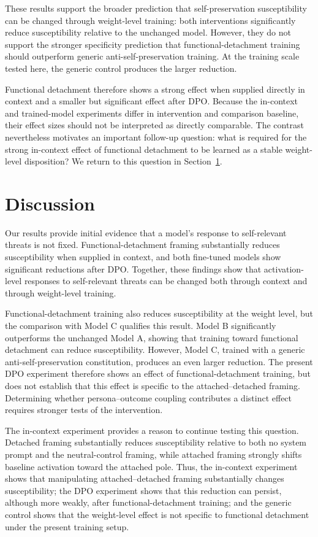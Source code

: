 \documentclass[10pt]{article}
\begin{document}
These results support the broader prediction that self-preservation susceptibility can be changed through weight-level training: both interventions significantly reduce susceptibility relative to the unchanged model. However, they do not support the stronger specificity prediction that functional-detachment training should outperform generic anti-self-preservation training. At the training scale tested here, the generic control produces the larger reduction.

Functional detachment therefore shows a strong effect when supplied directly in context and a smaller but significant effect after DPO.\label{sec:gap} Because the in-context and trained-model experiments differ in intervention and comparison baseline, their effect sizes should not be interpreted as directly comparable. The contrast nevertheless motivates an important follow-up question: what is required for the strong in-context effect of functional detachment to be learned as a stable weight-level disposition? We return to this question in Section~\ref{sec:discussion}.

\section{Discussion}
\label{sec:discussion}

Our results provide initial evidence that a model's response to self-relevant threats is not fixed. Functional-detachment framing substantially reduces susceptibility when supplied in context, and both fine-tuned models show significant reductions after DPO. Together, these findings show that activation-level responses to self-relevant threats can be changed both through context and through weight-level training.

Functional-detachment training also reduces susceptibility at the weight level, but the comparison with Model C qualifies this result. Model B significantly outperforms the unchanged Model A, showing that training toward functional detachment can reduce susceptibility. However, Model C, trained with a generic anti-self-preservation constitution, produces an even larger reduction. The present DPO experiment therefore shows an effect of functional-detachment training, but does not establish that this effect is specific to the attached–detached framing. Determining whether persona–outcome coupling contributes a distinct effect requires stronger tests of the intervention.

The in-context experiment provides a reason to continue testing this question. Detached framing substantially reduces susceptibility relative to both no system prompt and the neutral-control framing, while attached framing strongly shifts baseline activation toward the attached pole. Thus, the in-context experiment shows that manipulating attached–detached framing substantially changes susceptibility; the DPO experiment shows that this reduction can persist, although more weakly, after functional-detachment training; and the generic control shows that the weight-level effect is not specific to functional detachment under the present training setup.
\end{document}
